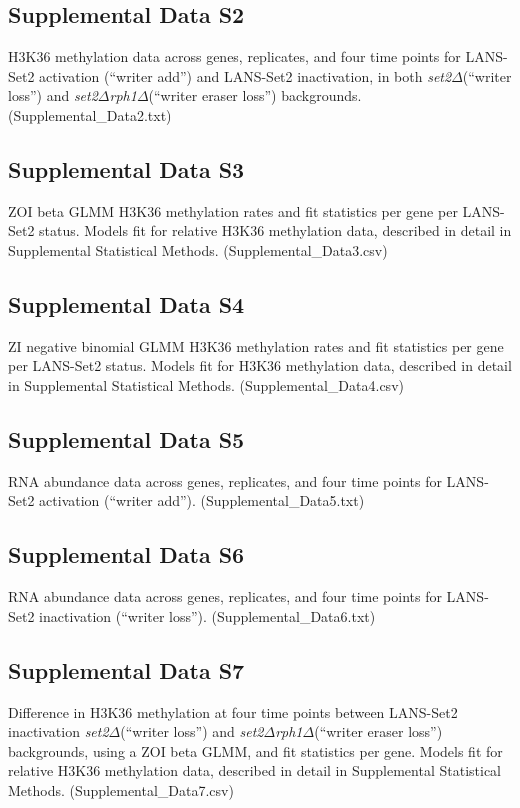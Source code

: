\documentclass[11pt]{biorxiv}
\newcommand{\setdelt}{\emph{set2$\Delta$}\xspace}
\newcommand{\setdeltrphdelt}{\emph{set2$\Delta$rph1$\Delta$}\xspace}
\begin{document}
\subsection{Supplemental Data S2}

H3K36 methylation data across genes, replicates, and four time points for LANS-Set2 activation (``writer add'') and LANS-Set2 inactivation, in both \setdelt (``writer loss'') and \setdeltrphdelt (``writer eraser loss'') backgrounds. (Supplemental\_Data2.txt)

\subsection{Supplemental Data S3}

ZOI beta GLMM H3K36 methylation rates and fit statistics per gene per LANS-Set2 status. Models fit for relative H3K36 methylation data, described in detail in Supplemental Statistical Methods. (Supplemental\_Data3.csv)

\subsection{Supplemental Data S4}

ZI negative binomial GLMM H3K36 methylation rates and fit statistics per gene per LANS-Set2 status. Models fit for H3K36 methylation data, described in detail in Supplemental Statistical Methods. (Supplemental\_Data4.csv)

\subsection{Supplemental Data S5}

RNA abundance data across genes, replicates, and four time points for LANS-Set2 activation (``writer add''). (Supplemental\_Data5.txt)

\subsection{Supplemental Data S6}

RNA abundance data across genes, replicates, and four time points for LANS-Set2 inactivation (``writer loss''). (Supplemental\_Data6.txt)

\subsection{Supplemental Data S7}

Difference in H3K36 methylation at four time points between LANS-Set2 inactivation \setdelt (``writer loss'') and \setdeltrphdelt (``writer eraser loss'') backgrounds, using a ZOI beta GLMM, and fit statistics per gene. Models fit for relative H3K36 methylation data, described in detail in Supplemental Statistical Methods. (Supplemental\_Data7.csv)
\end{document}
